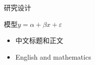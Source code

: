 \documentclass[aspectratio=169,fontset=fandol]{ctexbeamer}
\begin{document}
\frame{\titlepage}
\begin{frame}{研究设计}\begin{block}{模型}$y=\alpha+\beta x+\varepsilon$\end{block}
\begin{itemize}\item 中文标题和正文\item English and mathematics\end{itemize}\end{frame}
\end{document}
